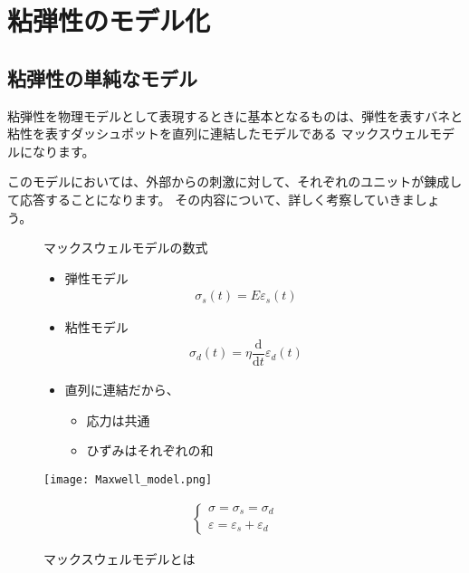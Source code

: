 \documentclass[uplatex,dvipdfmx,a4paper,11pt]{jsarticle}
\begin{document}
\section{粘弾性のモデル化}

\subsection{粘弾性の単純なモデル}
粘弾性を物理モデルとして表現するときに基本となるものは、弾性を表すバネと粘性を表すダッシュポットを直列に連結したモデルである
マックスウェルモデルになります。

このモデルにおいては、外部からの刺激に対して、それぞれのユニットが錬成して応答することになります。
その内容について、詳しく考察していきましょう。

\begin{figure}[htb]
	\begin{center}
		\begin{minipage}{0.45\textwidth}
			\begin{itembox}[l]{マックスウェルモデルの数式}
				\begin{itemize}
					\item 弾性モデル
					\begin{align*}
						\sigma_s(t) = E \varepsilon_s(t)
					\end{align*}
					\item 粘性モデル
					\begin{align*}
						\sigma_d(t) = \eta \dfrac{\mathrm{d}}{\mathrm{d}t}\varepsilon_d(t)
					\end{align*}
					\item 直列に連結だから、
					\begin{itemize}
						\item 応力は共通
					\item ひずみはそれぞれの和
					\end{itemize}
				\end{itemize}	
			\end{itembox}
		\end{minipage}
		\begin{minipage}{0.45\textwidth}
			\begin{center}
			\texttt{[image: Maxwell\_model.png]}
			\end{center}
			\begin{align*}
				\begin{cases}
					\sigma = \sigma_s = \sigma_d \\
					\varepsilon = \varepsilon_s + \varepsilon_d
				\end{cases}
			\end{align*}
		\end{minipage}
		\caption{マックスウェルモデルとは}
		\label{fig:maxwell}
	\end{center}
\end{figure}
\end{document}
